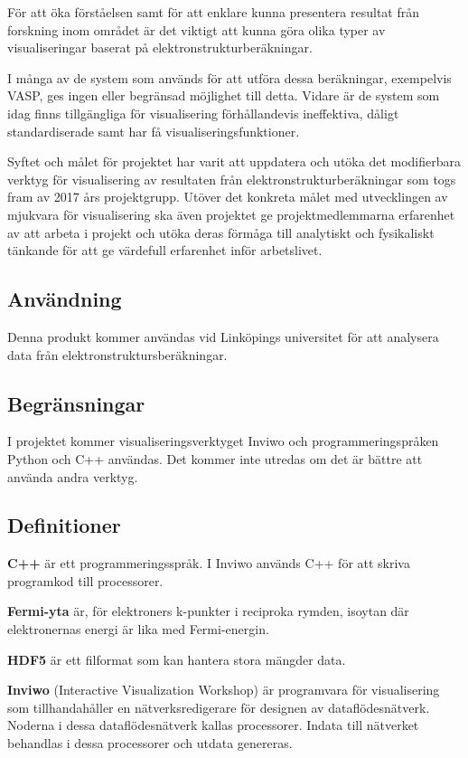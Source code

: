 \documentclass[a4paper,12pt]{article}
\begin{document}
För att öka förståelsen samt för att enklare kunna presentera resultat från forskning inom området är det viktigt att kunna göra olika typer av visualiseringar baserat på elektronstrukturberäkningar.

I många av de system som används för att utföra dessa beräkningar, exempelvis VASP, ges ingen eller begränsad möjlighet till detta. Vidare är de system som idag finns tillgängliga för visualisering förhållandevis ineffektiva, dåligt standardiserade samt har få visualiseringsfunktioner.

Syftet och målet för projektet har varit att uppdatera och utöka det modifierbara verktyg för visualisering av resultaten från elektronstrukturberäkningar som togs fram av 2017 års projektgrupp. Utöver det konkreta målet med utvecklingen av mjukvara för visualisering ska även projektet ge projektmedlemmarna erfarenhet av att arbeta i projekt och utöka deras förmåga till analytiskt och fysikaliskt tänkande för att ge värdefull erfarenhet inför arbetslivet.

\subsection{Användning}
Denna produkt kommer användas vid Linköpings universitet för att analysera data från elektronstruktursberäkningar.

\subsection{Begränsningar}
I projektet kommer visualiseringsverktyget Inviwo och
programmeringspråken Python och C++ användas. Det kommer inte utredas
om det är bättre att använda andra verktyg.

\subsection{Definitioner}

\textbf{C++} är ett programmeringsspråk.
\cite{C++}
\newline
I Inviwo används C++ för att skriva programkod till
processorer.

\textbf{Fermi-yta} är, för elektroners k-punkter i reciproka rymden, isoytan där elektronernas energi är lika med Fermi-energin.
\cite{Fermi-yta}

\textbf{HDF5} är ett filformat som kan hantera stora mängder data.
\cite{hdf5}

\textbf{Inviwo} (Interactive Visualization Workshop) är programvara
för visualisering som tillhandahåller en nätverksredigerare för
designen av dataflödesnätverk. Noderna i dessa dataflödesnätverk
kallas processorer. Indata till nätverket behandlas i dessa
processorer och utdata genereras.
\cite{Inviwo}
\end{document}
